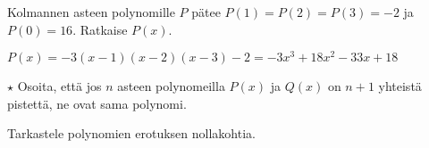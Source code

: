 \begin{tehtavasivu}
\begin{tehtava}
    Kolmannen asteen polynomille $P$ pätee $P(1)=P(2)=P(3)=-2$ ja $P(0)=16$. Ratkaise $P(x)$.
    \begin{vastaus}
        $P(x)=-3(x-1)(x-2)(x-3)-2=-3x^3+18x^2-33x+18$
    \end{vastaus}
\end{tehtava}

\begin{tehtava}
   	$\star$ Osoita, että jos $n$ asteen polynomeilla $P(x)$ ja $Q(x)$ on $n+1$ yhteistä pistettä, ne ovat sama polynomi.
    \begin{vastaus}
        Tarkastele polynomien erotuksen nollakohtia.
    \end{vastaus}
\end{tehtava}

\end{tehtavasivu}